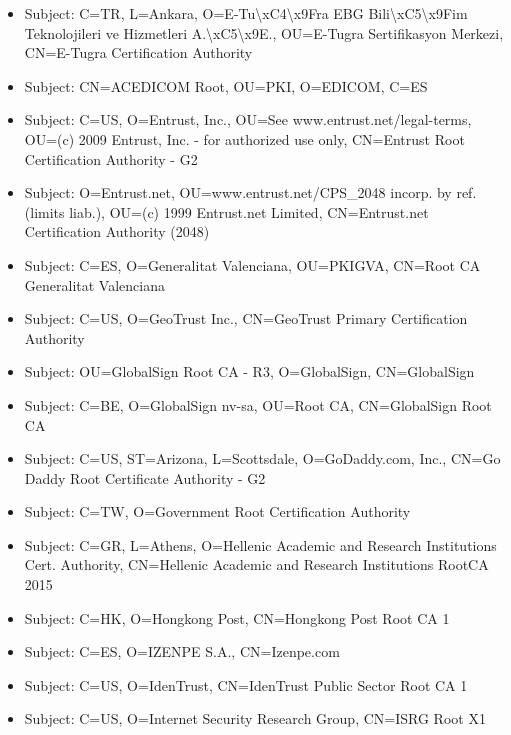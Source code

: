 \documentclass[xcolor={dvipsnames,svgnames},hyperref=dvips]{beamer}
\begin{document}
	\begin{frame}
		\begin{itemize}
		\item Subject: C=TR, L=Ankara, O=E-Tu\textbackslash xC4\textbackslash x9Fra EBG Bili\textbackslash xC5\textbackslash x9Fim Teknolojileri ve Hizmetleri A.\textbackslash xC5\textbackslash x9E., OU=E-Tugra Sertifikasyon Merkezi, CN=E-Tugra Certification Authority
		\item Subject: CN=ACEDICOM Root, OU=PKI, O=EDICOM, C=ES
		\item Subject: C=US, O=Entrust, Inc., OU=See www.entrust.net/legal-terms, OU=(c) 2009 Entrust, Inc. - for authorized use only, CN=Entrust Root Certification Authority - G2
		\item Subject: O=Entrust.net, OU=www.entrust.net/CPS\_2048 incorp. by ref. (limits liab.), OU=(c) 1999 Entrust.net Limited, CN=Entrust.net Certification Authority (2048)
		\item Subject: C=ES, O=Generalitat Valenciana, OU=PKIGVA, CN=Root CA Generalitat Valenciana
		\end{itemize}
	\end{frame}
	\begin{frame}
		\begin{itemize}
		\item Subject: C=US, O=GeoTrust Inc., CN=GeoTrust Primary Certification Authority
		\item Subject: OU=GlobalSign Root CA - R3, O=GlobalSign, CN=GlobalSign
		\item Subject: C=BE, O=GlobalSign nv-sa, OU=Root CA, CN=GlobalSign Root CA
		\item Subject: C=US, ST=Arizona, L=Scottsdale, O=GoDaddy.com, Inc., CN=Go Daddy Root Certificate Authority - G2
		\item Subject: C=TW, O=Government Root Certification Authority
		\end{itemize}
	\end{frame}
	\begin{frame}
		\begin{itemize}
		\item Subject: C=GR, L=Athens, O=Hellenic Academic and Research Institutions Cert. Authority, CN=Hellenic Academic and Research Institutions RootCA 2015
		\item Subject: C=HK, O=Hongkong Post, CN=Hongkong Post Root CA 1
		\item Subject: C=ES, O=IZENPE S.A., CN=Izenpe.com
		\item Subject: C=US, O=IdenTrust, CN=IdenTrust Public Sector Root CA 1
		\item Subject: C=US, O=Internet Security Research Group, CN=ISRG Root X1
		\end{itemize}
	\end{frame}
\end{document}
